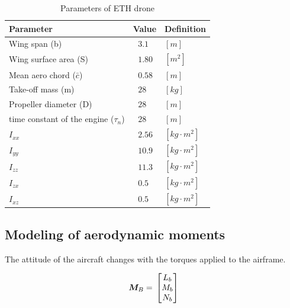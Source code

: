  \begin{table}
\caption{Parameters of ETH drone \cite{bronz2016aerodynamic}}
\label{arm:ethDrone}
\begin{center}
\begin{tabular}{ ||p{6cm}|p{3cm}|p{2cm}||}\hline
\textbf{Parameter} & \textbf{Value} & \textbf{Definition} \\\hline
Wing span (b)                & $\ \ \, 3.1 $	   & $[m]$ \\\hline
Wing surface area (S)      & $ \ \ \, 1.80$           &  $[m^2]$ \\\hline
Mean aero chord ($\bar{c}$)          & $\ \ \, 0.58$           & $[m]$ \\\hline
Take-off mass (m)             & $\ \ \, 28$       & $[kg]$ \\\hline
Propeller diameter (D)           & $\ \ \, 28$       & $[m]$ \\\hline
time constant of the engine ($\tau_n$)           & $\ \ \, 28$       & $[m]$ \\\hline
$I_{xx}$                         & $\ \ \, 2.56$   & $[kg \cdot m^2]$ \\\hline
$I_{yy}$                         & $\ \ \, 10.9$   & $[kg \cdot m^2]$ \\\hline
$I_{zz}$                         & $\ \ \, 11.3$   & $[kg \cdot m^2]$ \\\hline
$I_{zx}$                         & $\ \ \, 0.5$   & $[kg \cdot m^2]$ \\\hline
$I_{xz}$                         & $\ \ \, 0.5$   & $[kg \cdot m^2]$ \\\hline
\end{tabular}
\end{center}
\end{table}

\subsection{Modeling of aerodynamic moments}

The attitude of the aircraft changes with the torques applied to the airframe. 

\begin{equation}{\label{eqn:torqueTotal}}
\bm{M}_B
= \,
\begin{bmatrix}
L_{b} \\
M_{b}\\
N_{b}\\
\end{bmatrix}
\end{equation}

